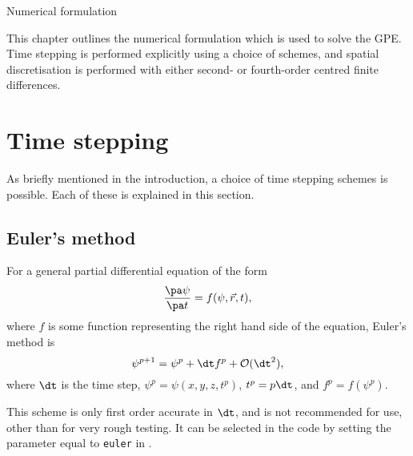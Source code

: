 %
%
%

\begin{chapter}{\label{cha:numerics}Numerical formulation}

  This chapter outlines the numerical formulation which is used to solve the
  GPE.  Time stepping is performed explicitly using a choice of schemes, and
  spatial discretisation is performed with either second- or fourth-order
  centred finite differences.

  \section{Time stepping}
  As briefly mentioned in the introduction, a choice of time stepping schemes
  is possible.  Each of these is explained in this section.

  \subsection{Euler's method}
  For a general partial differential equation of the form
  \begin{equation*}
    \frac{\pa \psi}{\pa t} = f(\psi, \vec{r}, t),
  \end{equation*}
  where $f$ is some function representing the right hand side of the equation,
  Euler's method is
  \begin{equation*}
    \psi^{p+1} = \psi^{p} + \dt f^{p} + \mathcal{O}(\dt^{2}),
  \end{equation*}
  where $\dt$ is the time step, $\psi^{p} = \psi\left( x, y, z, t^{p}\right)$,
  $t^{p} = p\dt$, and $f^{p} = f\left( \psi^{p} \right)$.

  This scheme is only first order accurate in $\dt$, and is not recommended for
  use, other than for very rough testing.  It can be selected in the code by
  setting the parameter  equal to \verb"euler" in
  .


\end{chapter}

